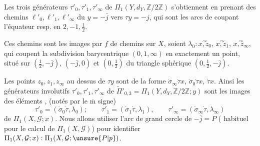 Les trois générateurs   $\tau'_0,\tau'_1,\tau'_\infty$ de $\Pi_1(Y,d_Y,\mathbb Z/2\mathbb Z)$  s'obtiennent en prenant des chemins $\ell'_0,\ell'_1,\ell'_\infty$ du  $y=-\bar j$ vers  $\tau y=-j$, qui sont les arcs de  coupant l'équateur resp. en $2,-1,\frac12$.


Ces chemins sont les images par $f$ de chemins sur $X$, soient $\lambda_0:\overset{\curvearrowright}{x,z_0}$,  $\overset{\curvearrowright}{x,z_1}$, \inserted{$\lambda_\infty:$} $\overset{\curvearrowright}{x,z_\infty}$, qui coupent  la subdivision barycentrique   $(0,1,\infty)$ en exactement un point, situé  sur  $(\frac12,-\bar j)$, $(-\bar j,0)$ et $(0,\frac12)$ du triangle sphérique $(0,\frac12,-\bar j)$.


Les points  $z_0,z_1,z_\infty$ au dessus de $\tau y$ sont  de la forme  $\dot\sigma_\infty\dot\tau x$,  $\dot\sigma_0\dot\tau x$,  \deleted{$\unsure{\dot\sigma_\infty}$} $\dot\tau x$.
Ainsi les générateurs involutifs $\tau'_0,\tau'_1,\tau'_\infty$ de $\widetilde\Pi'_{0,3}=\Pi_1(Y,d_Y,\mathbb Z/2\mathbb Z;y)$ sont les images des éléments , (notés par le $\overline{\mathrm m}$ signe)
\[
\tau'_0=(\dot\sigma_0\dot\tau,\lambda_0);\qquad
\tau'_1=(\dot\sigma_1\dot\tau,\lambda_1),\qquad
\tau'_\infty=(\dot\sigma_\infty\dot\tau,\lambda_\infty)
\]
de $\Pi_1(X,\mathcal G;x)$. Nous allons utiliser l'arc de grand cercle \inserted{$\ell$} de  $-\bar j=P$ (  habituel pour le calcul de $\Pi_1(X,\mathcal G)$)  pour identifier $\Pi_1(X,\mathcal G;x):\Pi_1(X,\mathcal G;\unsure{P|p})$.

